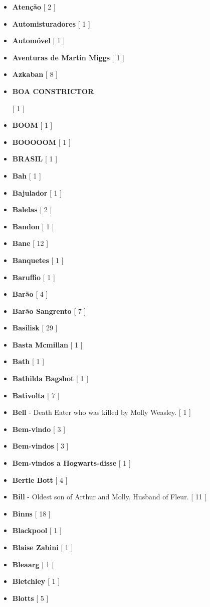 \documentclass[a4paper]{article}
\begin{document}
{\begin{itemize}
	\item \textbf{Atenção} [ 2 ]
	\item \textbf{Automisturadores} [ 1 ]
	\item \textbf{Automóvel} [ 1 ]
	\item \textbf{Aventuras de Martin Miggs} [ 1 ]
	\item \textbf{Azkaban} [ 8 ]
	\item \hypertarget{B}{\textbf{BOA CONSTRICTOR}} [ 1 ]
	\item \textbf{BOOM} [ 1 ]
	\item \textbf{BOOOOOM} [ 1 ]
	\item \textbf{BRASIL} [ 1 ]
	\item \textbf{Bah} [ 1 ]
	\item \textbf{Bajulador} [ 1 ]
	\item \textbf{Balelas} [ 2 ]
	\item \textbf{Bandon} [ 1 ]
	\item \textbf{Bane} [ 12 ]
	\item \textbf{Banquetes} [ 1 ]
	\item \textbf{Baruffio} [ 1 ]
	\item \textbf{Barão} [ 4 ]
	\item \textbf{Barão Sangrento} [ 7 ]
	\item \textbf{Basilisk} [ 29 ]
	\item \textbf{Basta Mcmillan} [ 1 ]
	\item \textbf{Bath} [ 1 ]
	\item \textbf{Bathilda Bagshot} [ 1 ]
	\item \textbf{Bativolta} [ 7 ]
	\item \textbf{Bell} - Death Eater who was killed by Molly Weasley. [ 1 ]
	\item \textbf{Bem-vindo} [ 3 ]
	\item \textbf{Bem-vindos} [ 3 ]
	\item \textbf{Bem-vindos a Hogwarts-disse} [ 1 ]
	\item \textbf{Bertie Bott} [ 4 ]
	\item \textbf{Bill} - Oldest son of Arthur and Molly. Husband of Fleur.  [ 11 ]
	\item \textbf{Binns} [ 18 ]
	\item \textbf{Blackpool} [ 1 ]
	\item \textbf{Blaise Zabini} [ 1 ]
	\item \textbf{Bleaarg} [ 1 ]
	\item \textbf{Bletchley} [ 1 ]
	\item \textbf{Blotts} [ 5 ]

\end{itemize}}
\end{document}
